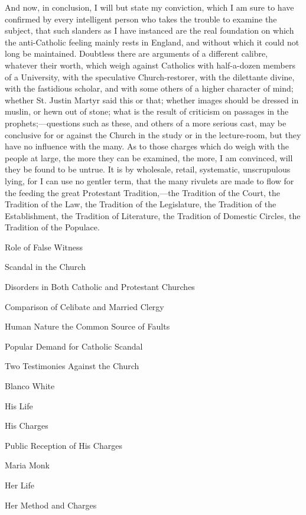 And now, in conclusion, I will but state my
conviction, which I am sure to have confirmed by every
intelligent person who takes the trouble to examine the
subject, that such slanders as I have instanced are the
real foundation on which the anti-Catholic feeling mainly
rests in England, and without which it could not long be
maintained. Doubtless there are arguments of a different
calibre, whatever their worth, which weigh against
Catholics with half-a-dozen members of a University, with
the speculative Church-restorer, with the dilettante
divine, with the fastidious scholar, and with some others
of a higher character of mind; whether St. Justin Martyr
said this or that; whether images should be dressed in
muslin, or hewn out of stone; what is the result of
criticism on passages in the prophets;—questions
such as these, and others of a more serious cast, may be
conclusive for or against the Church in the study or in
the lecture-room, but they have no influence with the
many. As to those charges which do weigh with the people
at large, the more they can be examined, the more, I am
convinced, will they be found to be untrue. It is by
wholesale, retail, systematic, unscrupulous lying, for I
can use no gentler term, that the many rivulets are made
to flow for the feeding the great Protestant
Tradition,—the Tradition of the Court, the Tradition
of the Law, the Tradition of the Legislature, the
Tradition of the Establishment, the Tradition of
Literature, the Tradition of Domestic Circles, the
Tradition of the Populace.


Role of False Witness

Scandal in the Church

Disorders in Both
Catholic and Protestant Churches

Comparison of
Celibate and Married Clergy

Human Nature the
Common Source of Faults

Popular Demand for Catholic
Scandal

Two Testimonies
Against the Church

Blanco White

His Life

His Charges

Public
Reception of His Charges

Maria Monk

Her Life

Her Method and
Charges

